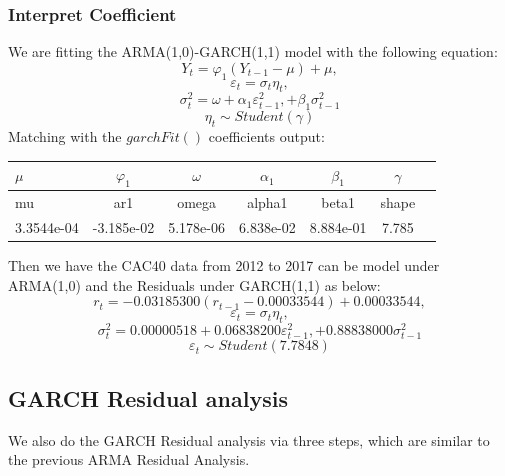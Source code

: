 \subsubsection{Interpret Coefficient}
We are fitting the ARMA(1,0)-GARCH(1,1) model with the following equation:
$$ Y_t = \varphi_1(Y_{t-1} - \mu) + \mu, $$
$$ \varepsilon_t = \sigma_t \eta_t, $$
$$ \sigma^2_t = \omega + \alpha_1 \varepsilon^2_{t-1},+ \beta_1\sigma^2_{t-1} $$
$$ \eta_t \sim Student(\gamma) $$
Matching with the $garchFit()$ coefficients output:

\FloatBarrier
\begin{table}[!htbp]
\centering
\begin{tabular}{|l|*{6}{c|}}
\hline
 $\mu$ & $\varphi_1$ & $\omega$ & $\alpha_1$ & $\beta_1$ & $\gamma$\\
 \hline
 mu & ar1 & omega & alpha1 & beta1 & shape\\
 \hline
 3.3544e-04 & -3.185e-02 & 5.178e-06 & 6.838e-02 & 8.884e-01 & 7.785\\
 \hline
\end{tabular}
\end{table}
\FloatBarrier

Then we have the CAC40 data from 2012 to 2017 can be model under ARMA(1,0) and the Residuals under GARCH(1,1) as below:
$$ r_t = -0.03185300(r_{t-1} - 0.00033544) + 0.00033544, $$
$$ \varepsilon_t = \sigma_t \eta_t, $$
$$ \sigma^2_t = 0.00000518 + 0.06838200 \varepsilon^2_{t-1},+ 0.88838000\sigma^2_{t-1} $$
$$ \varepsilon_t \sim Student(7.7848) $$

\subsection{GARCH Residual analysis}
We also do the GARCH Residual analysis via three steps, which are similar to the previous ARMA Residual Analysis. 


